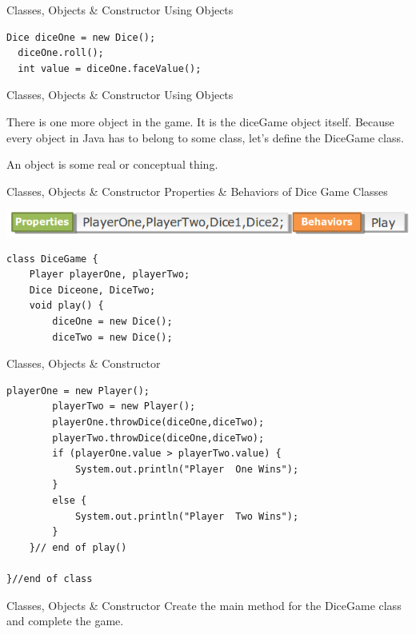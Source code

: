 \documentclass[14pt]{beamer}
\begin{document}
  \begin{frame}[fragile]{Classes, Objects \& Constructor}
  Using Objects
  \begin{lstlisting}[numbers=none]
  Dice diceOne = new Dice();
  diceOne.roll();
  int value = diceOne.faceValue();
  \end{lstlisting}
\end{frame}
\begin{frame}[fragile]{Classes, Objects \& Constructor}
  Using Objects
    
  There is one more object in the game. It is the diceGame object itself. Because every object in Java has to belong to some class, let's define the DiceGame class.

  \begin{block}{}
      An object is some real or conceptual thing.
  \end{block}
\end{frame}  
\begin{frame}[fragile]{Classes, Objects \& Constructor}
Properties \& Behaviors of Dice Game Classes
  \begin{center}
  \includegraphics[scale=0.5]{COJ-M01-S03-Image15.png}
  \end{center}

\begin{lstlisting}[numbers=none]
class DiceGame {
    Player playerOne, playerTwo;
    Dice Diceone, DiceTwo;
    void play() {
        diceOne = new Dice();
        diceTwo = new Dice();
\end{lstlisting}
\end{frame}
\begin{frame}[fragile]{Classes, Objects \& Constructor}
\begin{lstlisting}[numbers=none]
        playerOne = new Player();
        playerTwo = new Player();
        playerOne.throwDice(diceOne,diceTwo);
        playerTwo.throwDice(diceOne,diceTwo);
        if (playerOne.value > playerTwo.value) {
            System.out.println("Player  One Wins");
        }
        else {
            System.out.println("Player  Two Wins");
        }   
    }// end of play()
                                                                            
}//end of class
\end{lstlisting}
\end{frame}
\begin{frame}[fragile]{Classes, Objects \& Constructor}
Create the main method for the DiceGame class and complete the game.
\end{frame}
\end{document}
